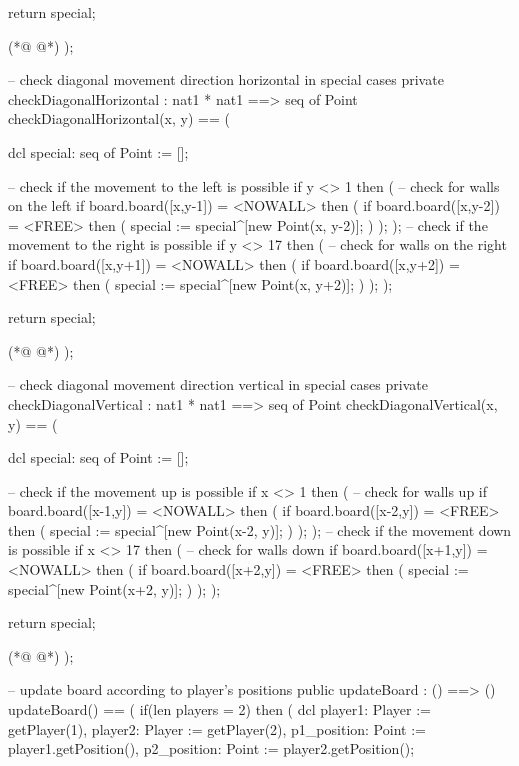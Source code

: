 \begin{vdmpp}[breaklines=true]
   return special;
   
(*@
\label{checkDiagonalHorizontal:376}
@*)
  );
  
  -- check diagonal movement direction horizontal in special cases
  private checkDiagonalHorizontal : nat1 * nat1 ==> seq of Point
  checkDiagonalHorizontal(x, y) ==
  (
  
   dcl special: seq of Point := [];
   
   -- check if the movement to the left is possible
   if y <> 1
   then
   (
    -- check for walls on the left
    if board.board([x,y-1]) = <NOWALL>
    then
    (
     if board.board([x,y-2]) = <FREE>
     then
     (
      special := special^[new Point(x, y-2)];
     )
    );
   );
   -- check if the movement to the right is possible
   if y <> 17
   then
   (
    -- check for walls on the right
    if board.board([x,y+1]) = <NOWALL>
    then
    (
     if board.board([x,y+2]) = <FREE>
     then
     (
      special := special^[new Point(x, y+2)];
     )
    );
   );
   
   return special;
   
(*@
\label{checkDiagonalVertical:418}
@*)
  );
  
  -- check diagonal movement direction vertical in special cases
  private checkDiagonalVertical : nat1 * nat1 ==> seq of Point
  checkDiagonalVertical(x, y) ==
  (
  
   dcl special: seq of Point := [];
   
   -- check if the movement up is possible
   if x <> 1
   then
   (
    -- check for walls up
    if board.board([x-1,y]) = <NOWALL>
    then
    (
     if board.board([x-2,y]) = <FREE>
     then
     (
      special := special^[new Point(x-2, y)];
     )
    );
   );
   -- check if the movement down is possible
   if x <> 17
   then
   (
    -- check for walls down
    if board.board([x+1,y]) = <NOWALL>
    then
    (
     if board.board([x+2,y]) = <FREE>
     then
     (
      special := special^[new Point(x+2, y)];
     )
    );
   );
  
   return special;
   
(*@
\label{updateBoard:460}
@*)
  );
  
  -- update board according to player's positions
  public updateBoard : () ==> () 
  updateBoard() ==
  (
   if(len players = 2) 
   then (
    dcl player1: Player := getPlayer(1),
    player2: Player := getPlayer(2),
    p1_position: Point := player1.getPosition(),
    p2_position: Point := player2.getPosition();
    

\end{vdmpp}
